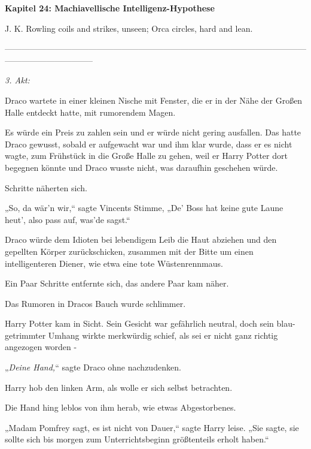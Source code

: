 

\hypertarget{machiavellische-intelligenz-hypothese}{%

\textbf{Kapitel 24: Machiavellische Intelligenz-Hypothese\\ }

\hfill\break J. K. Rowling coils and strikes, unseen; Orca circles, hard and lean.

--------------------------------------------------------------------------------------------------------------------------------------------

\hfill\break \emph{3. Akt:}

Draco wartete in einer kleinen Nische mit Fenster, die er in der Nähe der Großen Halle entdeckt hatte, mit rumorendem Magen.

Es würde ein Preis zu zahlen sein und er würde nicht gering ausfallen. Das hatte Draco gewusst, sobald er aufgewacht war und ihm klar wurde, dass er es nicht wagte, zum Frühstück in die Große Halle zu gehen, weil er Harry Potter dort begegnen könnte und Draco wusste nicht, was daraufhin geschehen würde.

Schritte näherten sich.

„So, da wär'n wir,“ sagte Vincents Stimme, „De' Boss hat keine gute Laune heut', also pass auf, was'de sagst.“

Draco würde dem Idioten bei lebendigem Leib die Haut abziehen und den gepellten Körper zurückschicken, zusammen mit der Bitte um einen intelligenteren Diener, wie etwa eine tote Wüstenrennmaus.

Ein Paar Schritte entfernte sich, das andere Paar kam näher.

Das Rumoren in Dracos Bauch wurde schlimmer.

Harry Potter kam in Sicht. Sein Gesicht war gefährlich neutral, doch sein blau-getrimmter Umhang wirkte merkwürdig schief, als sei er nicht ganz richtig angezogen worden -

„\emph{Deine Hand,}“ sagte Draco ohne nachzudenken.

Harry hob den linken Arm, als wolle er sich selbst betrachten.

Die Hand hing leblos von ihm herab, wie etwas Abgestorbenes.

„Madam Pomfrey sagt, es ist nicht von Dauer,“ sagte Harry leise. „Sie sagte, sie sollte sich bis morgen zum Unterrichtsbeginn größtenteils erholt haben.“

}
